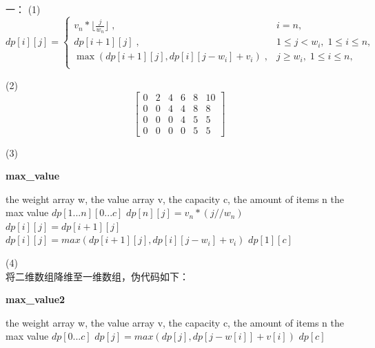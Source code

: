 \documentclass{article}
\begin{document}

一：
(1) \\
\[
dp[i][j] =  
\begin{cases}
    v_n * \lfloor{\frac{j}{w_n}}\rfloor \; , & i = n, \\
    dp[i + 1][j]\; , & 1 \leq j < w_i,\; 1 \leq i \leq n, \\
    \max{(dp[i + 1][j], dp[i][j - w_i] + v_i)}\; , & j \geq w_i,\; 1 \leq i \leq n, \\
\end{cases}
\]

(2) \\
\[
\begin{bmatrix}
0 & 2 & 4 & 6 & 8 & 10 \\
0 & 0 & 4 & 4 & 8 & 8 \\
0 & 0 & 0 & 4 & 5 & 5 \\
0 & 0 & 0 & 0 & 5 & 5 
\end{bmatrix}
\]

(3) \\
\begin{algorithm}
    \caption{\textbf{max\_value}}
    \label{alg:max_value}
    \begin{algorithmic}[1]
        \REQUIRE the weight array w, the value array v, the capacity c, the amount of items n
        \ENSURE the max value
        \STATE $dp[1...n][0...c]$
        \STATE $dp[n][j] = v_n * (j // w_n)$
        \ENDFOR
        \STATE $dp[i][j] = dp[i + 1][j]$
        \ELSE
        \STATE $dp[i][j] = max(dp[i + 1][j], dp[i][j - w_i] + v_i)$
        \ENDIF
        \ENDFOR
        \ENDFOR
        \RETURN $dp[1][c]$
    \end{algorithmic}
\end{algorithm}
(4)\\
将二维数组降维至一维数组，伪代码如下：
\begin{algorithm}
    \caption{\textbf{max\_value2}}
    \label{alg:max_value2}
    \begin{algorithmic}[1]
        \REQUIRE the weight array w, the value array v, the capacity c, the amount of items n
        \ENSURE the max value
        \STATE $dp[0...c]$
        \STATE $dp[j] = max(dp[j], dp[j - w[i]] + v[i])$
        \ENDFOR
        \ENDFOR
        \RETURN $dp[c]$
    \end{algorithmic}
\end{algorithm}
\end{document}
